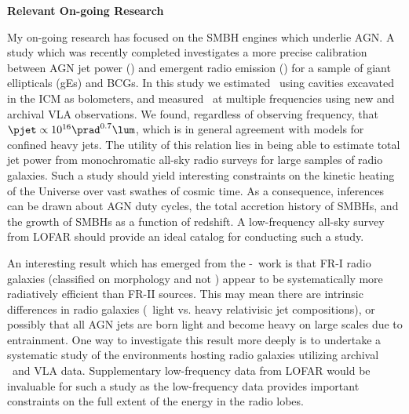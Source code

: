\documentclass[12pt]{article}
\begin{document}
{\bf{Relevant On-going Research}}

My on-going research has focused on the SMBH engines which underlie
AGN. A study which was recently completed \cite{pjet} investigates a
more precise calibration between AGN jet power (\pjet) and emergent
radio emission (\prad) for a sample of giant ellipticals (gEs) and
BCGs. In this study we estimated \pjet\ using cavities excavated in
the ICM as bolometers, and measured \prad\ at multiple frequencies
using new and archival VLA observations. We found, regardless of
observing frequency, that $\pjet \propto 10^{16} \prad^{0.7} \lum$,
which is in general agreement with models for confined heavy jets. The
utility of this relation lies in being able to estimate total jet
power from monochromatic all-sky radio surveys for large samples of
radio galaxies. Such a study should yield interesting constraints on
the kinetic heating of the Universe over vast swathes of cosmic
time. As a consequence, inferences can be drawn about AGN duty cycles,
the total accretion history of SMBHs, and the growth of SMBHs as a
function of redshift. A low-frequency all-sky survey from LOFAR should
provide an ideal catalog for conducting such a study.

An interesting result which has emerged from the \pjet-\prad\ work is
that FR-I radio galaxies (classified on morphology and not \prad)
appear to be systematically more radiatively efficient than FR-II
sources. This may mean there are intrinsic differences in radio
galaxies (\ie\ light vs. heavy relativisic jet compositions), or
possibly that all AGN jets are born light and become heavy on large
scales due to entrainment. One way to investigate this result more
deeply is to undertake a systematic study of the environments hosting
radio galaxies utilizing archival \chandra\ and VLA
data. Supplementary low-frequency data from LOFAR would be invaluable
for such a study as the low-frequency data provides important
constraints on the full extent of the energy in the radio lobes.
\end{document}
